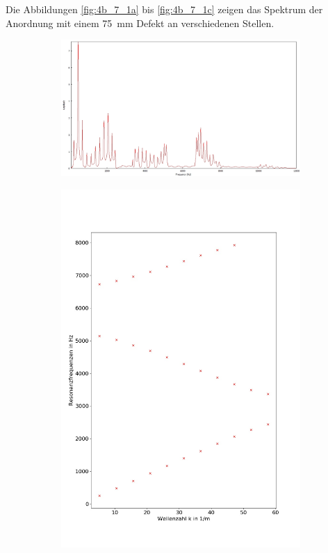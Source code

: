 Die Abbildungen \ref{fig:4b_7_1a} bis \ref{fig:4b_7_1c} zeigen das Spektrum der Anordnung mit einem 75~mm Defekt an verschiedenen Stellen.
\begin{figure}
\centering
\begin{subfigure}{0.65\textwidth}
\includegraphics[width=\textwidth]{content/messungen/Chapter4b/4b_7_1a.jpg}
\end{subfigure}
\begin{subfigure}{0.34\textwidth}
\includegraphics[width=\textwidth]{content/Scripts/4b_7_1a.jpg}

\end{subfigure}
\end{figure}

